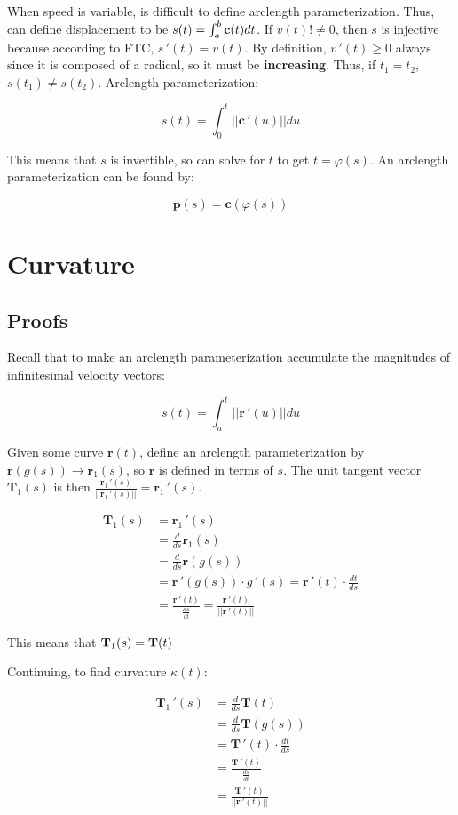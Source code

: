 \noindent
When speed is variable, is difficult to define arclength parameterization.
Thus, can define displacement to be $s(t)=\int_a^b \textbf{c}(t)dt$. If $v(t)!\neq 0$,
then $s$ is injective because according to FTC, $s\,'(t)=v(t)$.
By definition, $v\,'(t)\geq 0$ always since it is composed of a radical, so it must be \textbf{increasing}.
Thus, if $t_1=t_2$, $s(t_1)\neq s(t_2)$. Arclength parameterization:

\[s(t)=\int_0^t||\textbf{c}\,'(u)||du\]

\noindent
This means that $s$ is invertible, so can solve for $t$ to get $t=\varphi(s)$.
An arclength parameterization can be found by:

\[\boxed{\textbf{p}(s)=\textbf{c}(\varphi(s))}\]

\section{Curvature}

\subsection{Proofs}

Recall that to make an arclength parameterization accumulate the magnitudes of infinitesimal velocity vectors:

\[s(t)=\int_a^t ||\textbf{r}\,'(u)||du\]

Given some curve $\textbf{r}(t)$, define an arclength parameterization by $\textbf{r}(g(s))\rightarrow \textbf{r}_1(s)$, so 
$\textbf{r}$ is defined in terms of $s$. The unit tangent vector $\textbf{T}_1(s)$ is then $\frac{\textbf{r}_1\,'(s)}{||\textbf{r}_1\,'(s)||}=\textbf{r}_1\,'(s)$.

\begin{align*}
    \textbf{T}_1(s)&=\textbf{r}_1\,'(s)\\
    &=\frac{d}{ds}\textbf{r}_1(s)\\
    &=\frac{d}{ds}\textbf{r}(g(s))\\
    &=\textbf{r}\,'(g(s))\cdot g\,'(s)=\textbf{r}\,'(t)\cdot \frac{dt}{ds}\\
    &=\frac{\textbf{r}\,'(t)}{\frac{ds}{dt}}=\frac{\textbf{r}\,'(t)}{||\textbf{r}\,'(t)||}
\end{align*}

This means that $\textbf{T}_1(s)=\textbf T(t)$

Continuing, to find curvature $\kappa(t)$:

\begin{align*}
    \textbf{T}_1\,'(s)&=\frac{d}{ds}\textbf{T}(t)\\
    &=\frac{d}{ds}\textbf{T}(g(s))\\
    &=\textbf{T}\,'(t)\cdot \frac{dt}{ds}\\
    &=\frac{\textbf{T}\,'(t)}{\frac{ds}{dt}}\\
    &=\frac{\textbf{T}\,'(t)}{||\textbf{r}\,'(t)||}\\
\end{align*}

